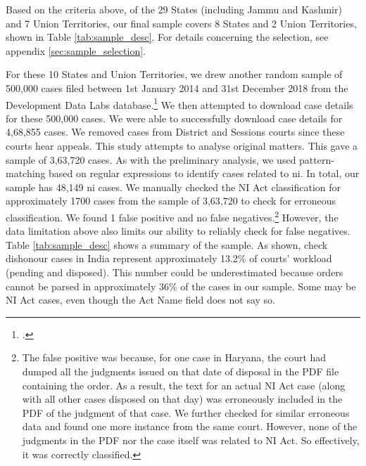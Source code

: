 Based on the criteria above, of the 29 States (including Jammu and Kashmir) and 7 Union Territories, our final sample covers 8 States and 2 Union Territories, shown in Table \ref{tab:sample_desc}. For details concerning the selection, see appendix \ref{sec:sample_selection}.

For these 10 States and Union Territories, we drew another random sample of 500,000 cases filed between 1st January 2014 and 31st December 2018 from the Development Data Labs database.\footcite{devdatalabs2021_eCourtsData} We then attempted to download case details for these 500,000 cases. We were able to successfully download case details for 4,68,855 cases. We removed cases from District and Sessions courts since these courts hear appeals. This study attempts to analyse original matters. This gave a sample of 3,63,720 cases. As with the preliminary analysis, we used pattern-matching based on regular expressions to identify cases related to \gls{ni}. In total, our sample has 48,149 \gls{ni} cases. We manually checked the NI Act classification for approximately 1700 cases from the sample of 3,63,720 to check for erroneous classification. We found 1 false positive and no false negatives.\footnote{The false positive was because, for one case in Haryana, the court had dumped all the judgments issued on that date of disposal in the PDF file containing the order. As a result, the text for an actual NI Act case (along with all other cases disposed on that day) was erroneously included in the PDF of the judgment of that case. We further checked for similar erroneous data and found one more instance from the same court. However, none of the judgments in the PDF nor the case itself was related to NI Act. So effectively, it was correctly classified.} However, the data limitation above also limits our ability to reliably check for false negatives. Table \ref{tab:sample_desc} shows a summary of the sample. As shown, check dishonour cases in India represent approximately 13.2\% of courts' workload (pending and disposed). This number could be underestimated because orders cannot be parsed in approximately 36\% of the cases in our sample. Some may be NI Act cases, even though the Act Name field does not say so.

